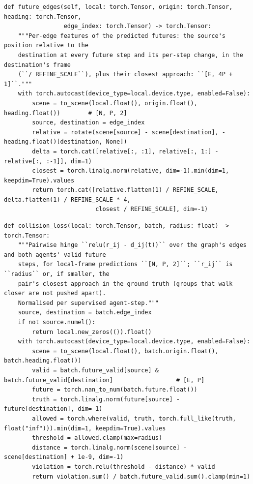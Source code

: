 \documentclass[10pt]{article}
\begin{document}
\begin{lstlisting}[aboveskip=2pt]
def future_edges(self, local: torch.Tensor, origin: torch.Tensor, heading: torch.Tensor,
                 edge_index: torch.Tensor) -> torch.Tensor:
    """Per-edge features of the predicted futures: the source's position relative to the
    destination at every future step and its per-step change, in the destination's frame
    (``/ REFINE_SCALE``), plus their closest approach: ``[E, 4P + 1]``."""
    with torch.autocast(device_type=local.device.type, enabled=False):
        scene = to_scene(local.float(), origin.float(), heading.float())        # [N, P, 2]
        source, destination = edge_index
        relative = rotate(scene[source] - scene[destination], -heading.float()[destination, None])
        delta = torch.cat([relative[:, :1], relative[:, 1:] - relative[:, :-1]], dim=1)
        closest = torch.linalg.norm(relative, dim=-1).min(dim=1, keepdim=True).values
        return torch.cat([relative.flatten(1) / REFINE_SCALE, delta.flatten(1) / REFINE_SCALE * 4,
                          closest / REFINE_SCALE], dim=-1)
\end{lstlisting}

\par\smallskip{}\par\nopagebreak
\begin{lstlisting}[aboveskip=2pt]
def collision_loss(local: torch.Tensor, batch, radius: float) -> torch.Tensor:
    """Pairwise hinge ``relu(r_ij - d_ij(t))`` over the graph's edges and both agents' valid future
    steps, for local-frame predictions ``[N, P, 2]``; ``r_ij`` is ``radius`` or, if smaller, the
    pair's closest approach in the ground truth (groups that walk closer are not pushed apart).
    Normalised per supervised agent-step."""
    source, destination = batch.edge_index
    if not source.numel():
        return local.new_zeros(()).float()
    with torch.autocast(device_type=local.device.type, enabled=False):
        scene = to_scene(local.float(), batch.origin.float(), batch.heading.float())
        valid = batch.future_valid[source] & batch.future_valid[destination]                  # [E, P]
        future = torch.nan_to_num(batch.future.float())
        truth = torch.linalg.norm(future[source] - future[destination], dim=-1)
        allowed = torch.where(valid, truth, torch.full_like(truth, float("inf"))).min(dim=1, keepdim=True).values
        threshold = allowed.clamp(max=radius)
        distance = torch.linalg.norm(scene[source] - scene[destination] + 1e-9, dim=-1)
        violation = torch.relu(threshold - distance) * valid
        return violation.sum() / batch.future_valid.sum().clamp(min=1)

\end{lstlisting}
\end{document}
